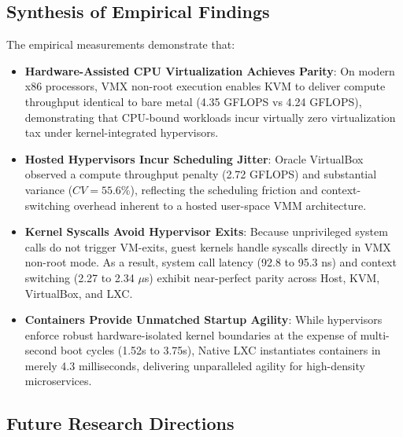 \subsection{Synthesis of Empirical Findings}
\label{subsec:findings_synthesis}

The empirical measurements demonstrate that:
\begin{itemize}
    \item \textbf{Hardware-Assisted CPU Virtualization Achieves Parity}: On modern x86 processors, VMX non-root execution enables KVM to deliver compute throughput identical to bare metal (4.35 GFLOPS vs 4.24 GFLOPS), demonstrating that CPU-bound workloads incur virtually zero virtualization tax under kernel-integrated hypervisors.
    \item \textbf{Hosted Hypervisors Incur Scheduling Jitter}: Oracle VirtualBox observed a compute throughput penalty (2.72 GFLOPS) and substantial variance ($CV = 55.6\%$), reflecting the scheduling friction and context-switching overhead inherent to a hosted user-space VMM architecture.
    \item \textbf{Kernel Syscalls Avoid Hypervisor Exits}: Because unprivileged system calls do not trigger VM-exits, guest kernels handle syscalls directly in VMX non-root mode. As a result, system call latency (92.8 to 95.3 ns) and context switching (2.27 to 2.34 $\mu$s) exhibit near-perfect parity across Host, KVM, VirtualBox, and LXC.
    \item \textbf{Containers Provide Unmatched Startup Agility}: While hypervisors enforce robust hardware-isolated kernel boundaries at the expense of multi-second boot cycles (1.52s to 3.75s), Native LXC instantiates containers in merely 4.3 milliseconds, delivering unparalleled agility for high-density microservices.
\end{itemize}

\subsection{Future Research Directions}
\label{subsec:future_work}

